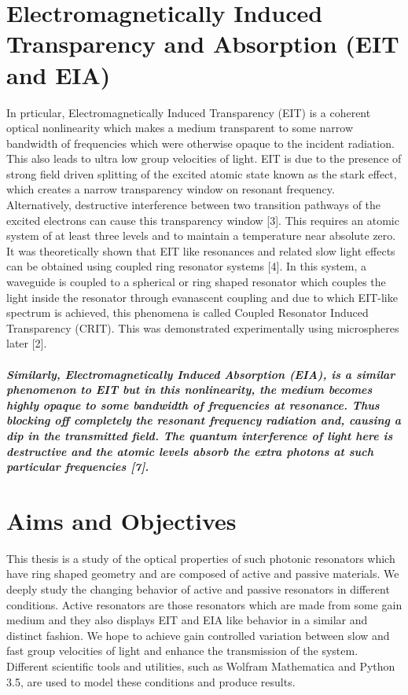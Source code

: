 \section{Electromagnetically Induced Transparency and Absorption (EIT and EIA)}
In prticular, Electromagnetically Induced Transparency (EIT) is a coherent optical nonlinearity which makes a medium transparent to some narrow bandwidth of frequencies which were otherwise opaque to the incident radiation. This also leads to ultra low group velocities of light. EIT is due to the presence of strong field driven splitting of the excited atomic state known as the stark effect, which creates a narrow transparency window on resonant frequency. Alternatively, destructive interference between two transition pathways of the excited electrons can cause this transparency window [3]. This requires an atomic system of at least three levels and to maintain a temperature near absolute zero. It was theoretically shown that EIT like resonances and related slow light effects can be obtained using coupled ring resonator systems [4]. In this system, a waveguide is coupled to a spherical or ring shaped resonator which couples the light inside the resonator through evanascent coupling and due to which EIT-like spectrum is achieved, this phenomena is called Coupled Resonator Induced Transparency (CRIT). This was demonstrated experimentally using microspheres later [2].	

\subparagraph{\normalfont \large Similarly, Electromagnetically Induced Absorption (EIA), is a similar phenomenon to EIT but in this nonlinearity, the medium becomes highly opaque to some bandwidth of frequencies at resonance. Thus blocking off completely the resonant frequency radiation and, causing a dip in the transmitted field. The quantum interference of light here is destructive and the atomic levels absorb the extra photons at such particular frequencies [7].}

\section{Aims and Objectives}
This thesis is a study of the optical properties of such photonic resonators which have ring shaped geometry and are composed of active and passive materials. We deeply study the changing behavior of active and passive resonators in different conditions. Active resonators are those resonators which are made from some gain medium and they also displays EIT and EIA like behavior in a similar and distinct fashion. We hope to achieve gain controlled variation between slow and fast group velocities of light and enhance the transmission of the system. Different scientific tools and utilities, such as Wolfram Mathematica and Python 3.5, are used to model these conditions and produce results.


